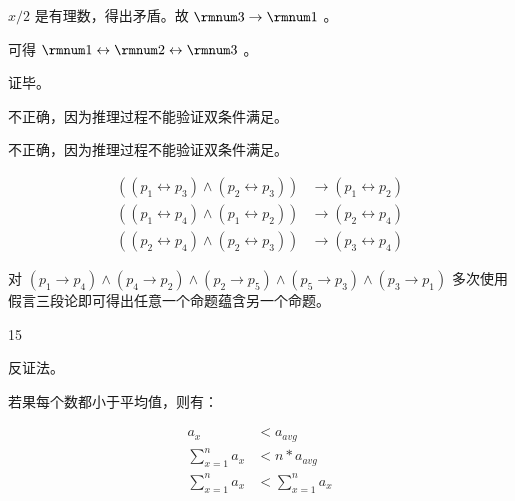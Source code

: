 {{\begin{practices}
            $x / 2$ 是有理数，得出矛盾。故 $\rmnum 3 \rightarrow \rmnum 1$ 。

            可得 $\rmnum 1 \leftrightarrow \rmnum 2 \leftrightarrow \rmnum 3$ 。

            证毕。
        \end{practices}

        \begin{practices}
            不正确，因为推理过程不能验证双条件满足。
        \end{practices}

        \begin{practices}
            不正确，因为推理过程不能验证双条件满足。
        \end{practices}

        \begin{practices}
            \begin{align*}
                ((p_1 \leftrightarrow p_3) \wedge (p_2 \leftrightarrow p_3)) &\rightarrow (p_1 \leftrightarrow p_2) \\
                ((p_1 \leftrightarrow p_4) \wedge (p_1 \leftrightarrow p_2)) &\rightarrow (p_2 \leftrightarrow p_4) \\
                ((p_2 \leftrightarrow p_4) \wedge (p_2 \leftrightarrow p_3)) &\rightarrow (p_3 \leftrightarrow p_4)
            \end{align*}
        \end{practices}

        \begin{practices}
            对 $(p_1 \rightarrow p_4) \wedge (p_4 \rightarrow p_2) \wedge (p_2 \rightarrow p_5) \wedge (p_5 \rightarrow p_3) \wedge (p_3 \rightarrow p_1)$ 多次使用假言三段论即可得出任意一个命题蕴含另一个命题。
        \end{practices}

        \begin{practices}
            15
        \end{practices}

        \begin{practices}
            反证法。

            若果每个数都小于平均值，则有：

            \begin{align*}
                a_x &< a_{avg} \\
                \sum_{x = 1}^{n} a_x &< n * a_{avg} \\
                \sum_{x = 1}^{n} a_x &< \sum_{x = 1}^{n} a_x
            \end{align*}


\end{practices}}}
